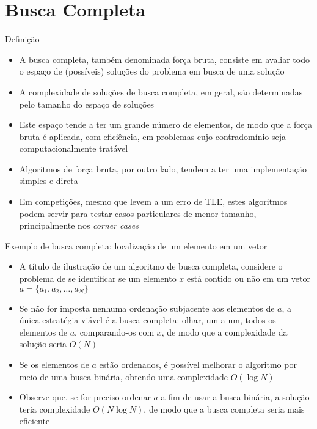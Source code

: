 \section{Busca Completa}

\begin{frame}[fragile]{Definição}

    \begin{itemize}
        \item A busca completa, também denominada força bruta, consiste em avaliar todo o
            espaço de (possíveis) soluções do problema em busca de uma solução

        \item A complexidade de soluções de busca completa, em geral, são determinadas pelo
            tamanho do espaço de soluções

        \item Este espaço tende a ter um grande número de elementos, de modo que a força
            bruta é aplicada, com eficiência, em problemas cujo contradomínio seja 
            computacionalmente tratável

        \item Algoritmos de força bruta, por outro lado, tendem a ter uma implementação simples e
            direta

        \item Em competições, mesmo que levem a um erro de TLE, estes algoritmos podem servir para 
            testar casos particulares de menor tamanho, principalmente nos 
            \textit{corner cases}
    \end{itemize}

\end{frame}

\begin{frame}[fragile]{Exemplo de busca completa: localização de um elemento em um vetor}

    \begin{itemize}
        \item A título de ilustração de um algoritmo de busca completa, considere o problema
            de se identificar se um elemento $x$ está contido ou não em um vetor 
            $a = \lbrace a_1, a_2, \ldots, a_N\rbrace$

        \item Se não for imposta nenhuma ordenação subjacente aos elementos de $a$, a única
            estratégia viável é a busca completa: olhar, um a um, todos os elementos de $a$,
            comparando-os com $x$, de modo que a complexidade da solução seria $O(N)$

        \item Se os elementos de $a$ estão ordenados, é possível melhorar o algoritmo por 
            meio de uma busca binária, obtendo uma complexidade $O(\log N)$

        \item Observe que, se for preciso ordenar $a$ a fim de usar a busca binária, a solução teria
            complexidade $O(N\log N)$, de modo que a busca completa seria mais eficiente
    \end{itemize}

\end{frame}

